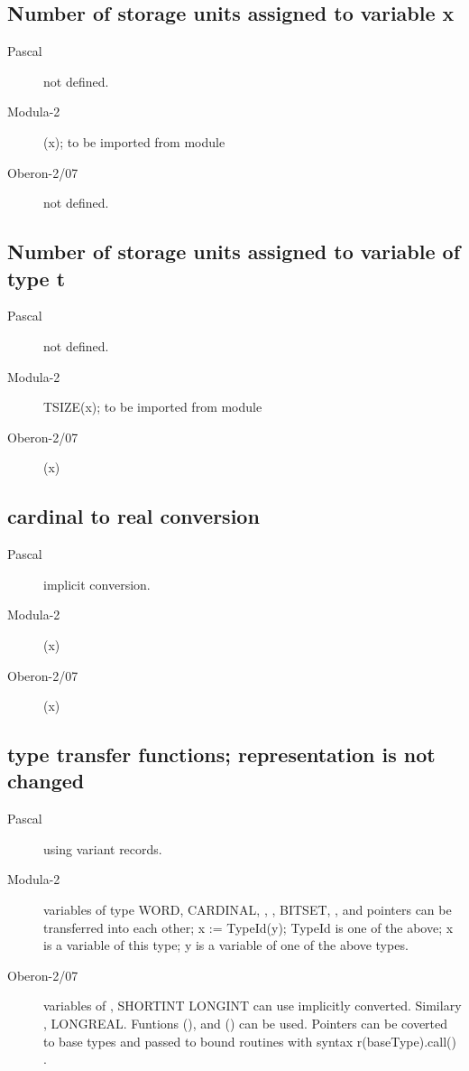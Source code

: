 \documentclass[10pt]{article}
\begin{document}
\subsection{Number of storage units assigned to variable x}
\begin{description}
    \item[Pascal]  not defined.
    
    \item[Modula-2] \SIZE(x); to be imported from module \SYSTEM
    
    \item[Oberon-2/07] not defined.
\end{description}

\subsection{Number of storage units assigned to variable of type t}
\begin{description}
    \item[Pascal]  not defined.
    
    \item[Modula-2] TSIZE(x); to be imported from module \SYSTEM
    
    \item[Oberon-2/07] \SIZE(x)
\end{description}

\subsection{cardinal to real conversion}
\begin{description}
    \item[Pascal]  implicit conversion.
    
    \item[Modula-2] \FLOAT(x)
    
    \item[Oberon-2/07] \FLT(x)
\end{description}

\subsection{type transfer functions; representation is not changed}
\begin{description}
    \item[Pascal] using variant records.
    
    \item[Modula-2] variables of type WORD, CARDINAL, \INTEGER, \REAL, BITSET, \ADDRESS, and pointers can be transferred
    into each other; x := TypeId(y); TypeId is one of the above; x is a variable of this type; y is a variable of one of the above types.
    
    \item[Oberon-2/07] variables of \INTEGER, SHORTINT LONGINT can use implicitly converted. Similary \REAL, LONGREAL. Funtions \LONG(), and \SHORT() can be used. Pointers can be coverted to base types and passed to bound routines with syntax r(baseType).call() .
\end{description}
\end{document}

